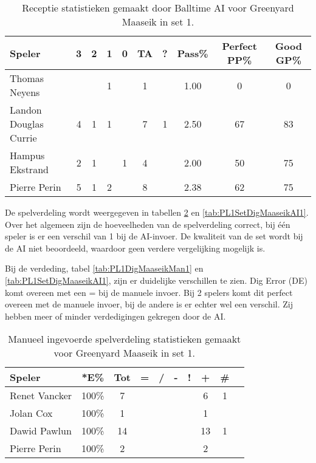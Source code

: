 \begin{table}[ht!]
  \centering
  \scriptsize
  \begin{tabular}{|l|c|c|c|c|c|c|c|c|c|} \hline
    \textbf{Speler} & 3 & 2 & 1 & 0 & TA & ? & Pass\% & Perfect PP\% & Good GP\% \\ \hline
    Thomas Neyens &  &  & 1 &  & 1 &  & 1.00 & 0 & 0  \\
    Landon Douglas Currie & 4 & 1 & 1 &  & 7 & 1 & 2.50 & 67 & 83 \\
    Hampus Ekstrand & 2 & 1 &  & 1 & 4 &  & 2.00 & 50 & 75 \\
    Pierre Perin & 5 & 1 & 2 &  & 8 &  & 2.38 & 62 & 75 \\ \hline
  \end{tabular}
  \caption[Receptie statistieken gemaakt door Balltime AI voor Greenyard Maaseik in set 1]{\label{tab:PL1ReceiveMaaseikAI1}Receptie statistieken gemaakt door Balltime AI voor Greenyard Maaseik in set 1.}
\end{table}

De spelverdeling wordt weergegeven in tabellen \ref{tab:PL1SetMaaseikMan1} en \ref{tab:PL1SetDigMaaseikAI1}. Over het algemeen zijn de hoeveelheden van de spelverdeling correct, bij één speler is er een verschil van 1 bij de AI-invoer. De kwaliteit van de set wordt bij de AI niet beoordeeld, waardoor geen verdere vergelijking mogelijk is.

Bij de verdeding, tabel \ref{tab:PL1DigMaaseikMan1} en \ref{tab:PL1SetDigMaaseikAI1}, zijn er duidelijke verschillen te zien. Dig Error (DE) komt overeen met een = bij de manuele invoer. Bij 2 spelers komt dit perfect overeen met de manuele invoer, bij de andere is er echter wel een verschil.  Zij hebben meer of minder verdedigingen gekregen door de AI.

\begin{table}[ht!]
    \centering
    \scriptsize
    \begin{tabular}{|l|c|c|c|c|c|c|c|c|c|}
        \hline
        \textbf{Speler}& *E\% & Tot & = & / & - & ! & + & \# \\ \hline
        Renet Vancker  & 100\% & 7 &  &  &  &  & 6 & 1  \\
        Jolan Cox  & 100\% & 1 &  &  &  &  & 1 &  \\ 
        Dawid Pawlun  & 100\% & 14 &  &  &  &  & 13 & 1  \\ 
        Pierre Perin & 100\% & 2 &  &  &  &  & 2 & \\ \hline
    \end{tabular}
    \caption[Manueel ingevoerde spelverdeling statistieken gemaakt voor Greenyard Maaseik in set 1]{\label{tab:PL1SetMaaseikMan1}Manueel ingevoerde spelverdeling statistieken gemaakt voor Greenyard Maaseik in set 1.}
\end{table}

